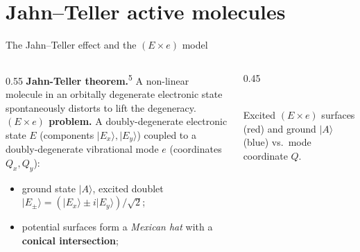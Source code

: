 \documentclass[aspectratio=169,11pt]{beamer}
\newcommand{\figcap}[1]{{\scriptsize\color{capgray}#1}}
\newcommand{\refmark}[1]{\textsuperscript{\color{srcgray}#1}}
\begin{document}
\section{Jahn--Teller active molecules}
\begin{frame}{The Jahn--Teller effect and the $(E\times e)$ model}
  \begin{columns}[T]
    \begin{column}{0.55\textwidth}
      \small
      \textbf{Jahn-Teller theorem.}\refmark{5} A non-linear molecule in an orbitally
      degenerate electronic state spontaneously distorts to lift the
      degeneracy.\\[0.4em]
      \textbf{$(E\times e)$ problem.} A doubly-degenerate electronic state $E$
      (components $|E_x\rangle,|E_y\rangle$) coupled to a doubly-degenerate
      vibrational mode $e$ (coordinates $Q_x,Q_y$):
      \begin{itemize}
        \item ground state $|A\rangle$, excited doublet $|E_\pm\rangle=(|E_x\rangle\pm i|E_y\rangle)/\sqrt2$;
        \item potential surfaces form a \emph{Mexican hat} with a
              \textbf{conical intersection};
      \end{itemize}
    \end{column}
    \begin{column}{0.45\textwidth}
      \centering
      \\[0.3em]
      \figcap{Excited $(E\times e)$ surfaces (red) and ground $|A\rangle$
      (blue) vs.\ mode coordinate $Q$.}
    \end{column}
  \end{columns}
\end{frame}
\end{document}
